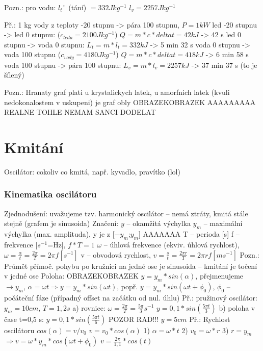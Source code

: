 \documentclass{article}
\begin{document}
Pozn.: pro vodu: $l_t¨$ (tání) $= 332 Jkg^{-1}$
$l_v = 2257 Jkg^{-1}$

Př.: 1 kg vody z teploty -20 stupnu -> pára 100 stupnu, $P = 1 kW$
led -20 stupnu -> led 0 stupnu: ($c_{ledu} = 2100 Jkg^{-1}$) $Q = m*c*deltat = 42 kJ$ -> 42 s
led 0 stupnu -> voda 0 stupnu: $L_t = m*l_t = 332 kJ$ -> 5 min 32 s
voda 0 stupnu -> voda 100 stupnu ($c_{vody} = 4180 Jkg^{-1}$) $Q = m*c*deltat = 418 kJ$ -> 6 min 58 s
voda 100 stupnu -> pára 100 stupnu: $L_v = m*l_v = 2257 kJ$ -> 37 min 37 s (to je šílený)

Pozn.: Hranaty graf plati u krystalickych latek, u amorfnich latek (kvuli nedokonalostem v uskupeni) je graf obly OBRAZEKOBRAZEK
AAAAAAAAA REALNE TOHLE NEMAM SANCI DODELAT

\part{Kmitání}
Oscilátor: cokoliv co kmitá, např. kyvadlo, pravítko (lol)

\section{Kinematika oscilátoru}
Zjednodušení: uvažujeme tzv. harmonický oscilátor -- nemá ztráty, kmitá stále stejně (grafem je sinusoida)
Značení: $y$ -- okamžitá výchylka
         $y_m$ -- maximální výchylka (max. amplituda), y je z [$-y_m$;$y_m$] AAAAAAA
         T -- perioda [s]
         f -- frekvence [$s^{-1}$=Hz], $f*T=1$
        $\omega$ -- úhlová frekvence (ekviv. úhlová rychlost), $\omega=\frac{\alpha}{t}=\frac{2\pi}{T}=2\pi f [s^{-1}]$
        v -- obvodová rychlost, $v=\frac{s}{t}=\frac{2\pi r}{T}=2\pi rf [ms^{-1}]$
Pozn.: Průmět přímoč. pohybu po kružnici na jedné ose je sinusoida -- kmitání je točení v jedné ose
Poloha: OBRAZEKOBRAZEK $y=y_m*sin(\alpha)$, přejmenujeme $\rightarrow y_m$, $\alpha = \omega t \Rightarrow y=y_m*sin(\omega t)$, popř. $y=y_m*sin(\omega t+{\phi}_0)$, ${\phi}_0$ -- počáteční fáze (případný offset na začátku od nul. úhlu)
Př.: pružinový oscilátor: $y_m=10cm$, $T=1,2s$
        a) rovnice: $\omega = \frac{2\pi}{T}=\frac{5\pi}{3}s^{-1}$
                    $y=0,1*sin(\frac{5\pi t}{3})$
        b) poloha v čase t=0,5 s: $y=0,1*sin(\frac{5\pi t}{6})$ POZOR RAD!!!
                                  $y=5cm$
Př.: Rychlost oscilátoru
     $cos (\alpha) = v/v_0$
     $v=v_0*cos (\alpha)$
        1) $\alpha = \omega * t$
        2) $v_0 = \omega * r$
        3) $r = y_m$
     $\Rightarrow v = \omega * y_m * cos(\omega t + {\phi}_0)$
     $v = \frac{2 \pi}{1,1}*cos(t)$
\end{document}
